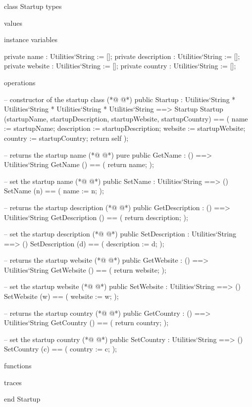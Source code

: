 \begin{vdmpp}[breaklines=true]
class Startup
types

values

instance variables

 private name : Utilities`String := [];
 private description : Utilities`String := [];
 private website : Utilities`String := [];
 private country : Utilities`String := [];

operations

 -- constructor of the startup class 
(*@
\label{Startup:16}
@*)
  public Startup :  Utilities`String *  Utilities`String *  Utilities`String * Utilities`String ==> Startup
    Startup (startupName, startupDescription, startupWebsite, startupCountry) == (
     name := startupName;
     description := startupDescription;
     website := startupWebsite;
     country := startupCountry;
     return self
    );
    
   -- returns the startup name
(*@
\label{GetName:26}
@*)
  pure public GetName : () ==> Utilities`String
    GetName () == (
     return name;
    );
    
   -- set the startup name
(*@
\label{SetName:32}
@*)
  public SetName : Utilities`String ==> ()
    SetName (n) == (
     name := n;
    );
    
   -- returns the startup description
(*@
\label{GetDescription:38}
@*)
  public GetDescription : () ==> Utilities`String
    GetDescription () == (
     return description;
    );
    
   -- set the startup description
(*@
\label{SetDescription:44}
@*)
  public SetDescription : Utilities`String ==> ()
    SetDescription (d) == (
     description := d;
    ); 
    
   -- returns the startup website
(*@
\label{GetWebsite:50}
@*)
  public GetWebsite : () ==> Utilities`String
    GetWebsite () == (
     return website;
    );
    
   -- set the startup website 
(*@
\label{SetWebsite:56}
@*)
  public SetWebsite : Utilities`String ==> ()
    SetWebsite (w) == (
     website := w;
    );
    
   -- returns the startup country
(*@
\label{GetCountry:62}
@*)
  public GetCountry : () ==> Utilities`String
    GetCountry () == (
     return country;
    );
    
   -- set the startup country
(*@
\label{SetCountry:68}
@*)
  public SetCountry : Utilities`String ==> ()
    SetCountry (c) == (
     country := c;
    ); 
    
    
functions

traces

end Startup
\end{vdmpp}
